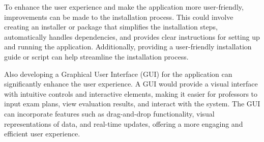 \vspace{\baselineskip}

To enhance the user experience and make the application more user-friendly, improvements can be made to the installation process. This could involve creating an installer or package that simplifies the installation steps, automatically handles dependencies, and provides clear instructions for setting up and running the application. Additionally, providing a user-friendly installation guide or script can help streamline the installation process.

\vspace{\baselineskip}

Also developing a Graphical User Interface (GUI) for the application can significantly enhance the user experience. A GUI would provide a visual interface with intuitive controls and interactive elements, making it easier for professors to input exam plans, view evaluation results, and interact with the system. The GUI can incorporate features such as drag-and-drop functionality, visual representations of data, and real-time updates, offering a more engaging and efficient user experience.